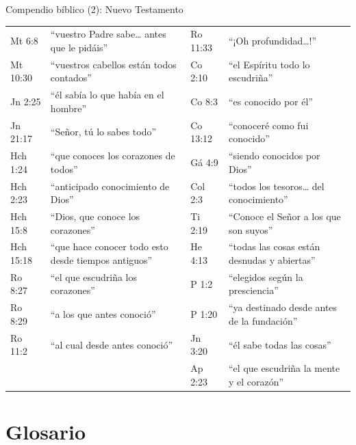 \documentclass[hyperref={bookmarks=false},aspectratio=169]{beamer}
\begin{document}
\begin{frame}{Compendio bíblico (2): Nuevo Testamento}
\fontsize{6.2}{7.4}\selectfont\renewcommand{\arraystretch}{1.06}
\begin{tabular}{@{}>{\RaggedRight\arraybackslash}p{1.5cm}>{\RaggedRight\arraybackslash}p{4.4cm}|>{\RaggedRight\arraybackslash}p{1.5cm}>{\RaggedRight\arraybackslash}p{4.4cm}@{}}
\toprule
Mt 6:8 & ``vuestro Padre sabe\ldots{} antes que le pidáis'' & Ro 11:33 & ``¡Oh profundidad\ldots!'' \\
Mt 10:30 & ``vuestros cabellos están todos contados'' & 1 Co 2:10 & ``el Espíritu todo lo escudriña'' \\
Jn 2:25 & ``él sabía lo que había en el hombre'' & 1 Co 8:3 & ``es conocido por él'' \\
Jn 21:17 & ``Señor, tú lo sabes todo'' & 1 Co 13:12 & ``conoceré como fui conocido'' \\
Hch 1:24 & ``que conoces los corazones de todos'' & Gá 4:9 & ``siendo conocidos por Dios'' \\
Hch 2:23 & ``anticipado conocimiento de Dios'' & Col 2:3 & ``todos los tesoros\ldots{} del conocimiento'' \\
Hch 15:8 & ``Dios, que conoce los corazones'' & 2 Ti 2:19 & ``Conoce el Señor a los que son suyos'' \\
Hch 15:18 & ``que hace conocer todo esto desde tiempos antiguos'' & He 4:13 & ``todas las cosas están desnudas y abiertas'' \\
Ro 8:27 & ``el que escudriña los corazones'' & 1 P 1:2 & ``elegidos según la presciencia'' \\
Ro 8:29 & ``a los que antes conoció'' & 1 P 1:20 & ``ya destinado desde antes de la fundación'' \\
Ro 11:2 & ``al cual desde antes conoció'' & 1 Jn 3:20 & ``él sabe todas las cosas'' \\
 & & Ap 2:23 & ``el que escudriña la mente y el corazón'' \\
\bottomrule
\end{tabular}
\end{frame}

\section{Glosario}
\end{document}
